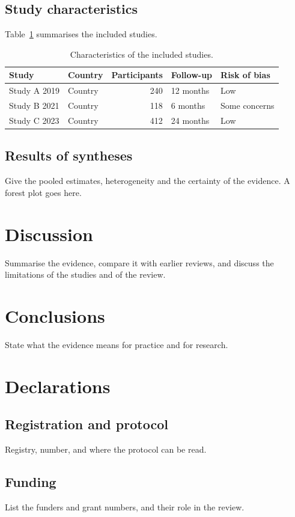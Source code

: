 \documentclass[11pt,a4paper]{article}
\begin{document}
\subsection{Study characteristics}
Table~\ref{tab:studies} summarises the included studies.

\begin{table}[htbp]
  \centering
  \caption{Characteristics of the included studies.}
  \label{tab:studies}
  \begin{tabular}{llrll}
    \toprule
    Study & Country & Participants & Follow-up & Risk of bias \\
    \midrule
    Study A 2019 & Country & 240 & 12 months & Low \\
    Study B 2021 & Country & 118 & 6 months & Some concerns \\
    Study C 2023 & Country & 412 & 24 months & Low \\
    \bottomrule
  \end{tabular}
\end{table}

\subsection{Results of syntheses}
Give the pooled estimates, heterogeneity and the certainty of the evidence.
A forest plot goes here.

\section{Discussion}
Summarise the evidence, compare it with earlier reviews, and discuss the
limitations of the studies and of the review.

\section{Conclusions}
State what the evidence means for practice and for research.

\section*{Declarations}
\subsection*{Registration and protocol}
Registry, number, and where the protocol can be read.

\subsection*{Funding}
List the funders and grant numbers, and their role in the review.
\end{document}

